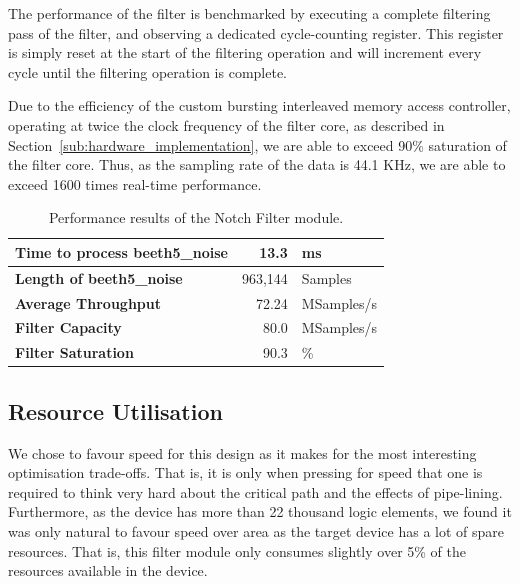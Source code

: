 \documentclass[]{article}
\begin{document}
The performance of the filter is benchmarked by executing a complete filtering pass of the filter, and observing a dedicated cycle-counting register. This register is simply reset at the start of the filtering operation and will increment every cycle until the filtering operation is complete.

Due to the efficiency of the custom bursting interleaved memory access controller, operating at twice the clock frequency of the filter core, as described in Section~\ref{sub:hardware_implementation}, we are able to exceed 90\% saturation of the filter core.
Thus, as the sampling rate of the data is 44.1 KHz, we are able to exceed 1600 times real-time performance.

\begin{table}[htbp]
	\caption{Performance results of the Notch Filter module.}
	\label{tab:notch_performance_results}
	\begin{center}
		\begin{tabular}{l|rl}
		\hline

		\hline
			\textbf{Time to process beeth5\_noise}	& 13.3 		& ms \\
		\hline
			\textbf{Length of beeth5\_noise}		& 963,144 	& Samples \\
		\hline
			\textbf{Average Throughput}				& 72.24 	& MSamples/s \\
		\hline
			\textbf{Filter Capacity}				& 80.0 		& MSamples/s \\
		\hline
			\textbf{Filter Saturation}				& 90.3 		& \% \\
		\hline

		\hline
		\end{tabular}
	\end{center}
\end{table}



\subsection{Resource Utilisation} %
\label{sub:resource_utilisation}

We chose to favour speed for this design as it makes for the most interesting optimisation trade-offs. That is, it is only when pressing for speed that one is required to think very hard about the critical path and the effects of pipe-lining.
Furthermore, as the device has more than 22 thousand logic elements, we found it was only natural to favour speed over area as the target device has a lot of spare resources.
That is, this filter module only consumes slightly over 5\% of the resources available in the device.
\end{document}
